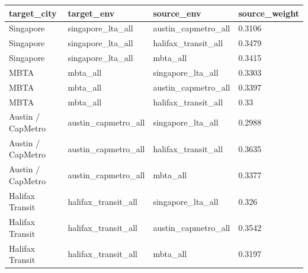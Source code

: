 \begin{tabular}{llll}
\toprule
target\_city & target\_env & source\_env & source\_weight \\
\midrule
Singapore & singapore\_lta\_all & austin\_capmetro\_all & 0.3106 \\
Singapore & singapore\_lta\_all & halifax\_transit\_all & 0.3479 \\
Singapore & singapore\_lta\_all & mbta\_all & 0.3415 \\
MBTA & mbta\_all & singapore\_lta\_all & 0.3303 \\
MBTA & mbta\_all & austin\_capmetro\_all & 0.3397 \\
MBTA & mbta\_all & halifax\_transit\_all & 0.33 \\
Austin / CapMetro & austin\_capmetro\_all & singapore\_lta\_all & 0.2988 \\
Austin / CapMetro & austin\_capmetro\_all & halifax\_transit\_all & 0.3635 \\
Austin / CapMetro & austin\_capmetro\_all & mbta\_all & 0.3377 \\
Halifax Transit & halifax\_transit\_all & singapore\_lta\_all & 0.326 \\
Halifax Transit & halifax\_transit\_all & austin\_capmetro\_all & 0.3542 \\
Halifax Transit & halifax\_transit\_all & mbta\_all & 0.3197 \\
\bottomrule
\end{tabular}
